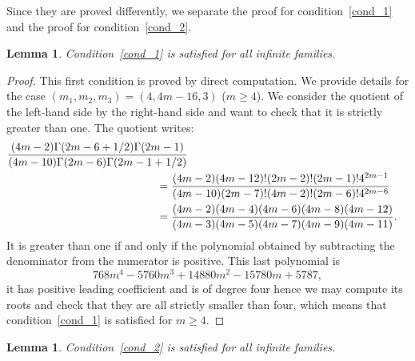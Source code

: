 \documentclass[JEP,XML,SOM,Unicode, NoEqCountersInSection, NoFloatCountersInSection]{cedram}
\theoremstyle{plain}
\newtheorem{lem}[thm]{Lemma}
\theoremstyle{definition}
\begin{document}
Since they are proved differently, we separate the proof for condition~\eqref{cond_1}
and the proof for condition~\eqref{cond_2}.

\begin{lem}
Condition~\eqref{cond_1} is satisfied for all infinite families.
\end{lem}

\begin{proof}
This first condition is proved by direct computation.
We provide details for the case $(m_1,m_2,m_3)=(4,4m-16,3)$ ($m\geq 4$).
We consider the quotient of the left-hand side by the right-hand side and want to check that it is
strictly greater than one. The quotient writes:
\begin{align*}
 \frac{(4m-2)\Gamma(2m-6+1/2)\Gamma(2m-1)}{(4m-10)\Gamma(2m-6)\Gamma(2m-1+1/2)}\\
&\hspace*{-1cm} =\frac{(4m-2)(4m-12)!(2m-2)!(2m-1)!4^{2m-1}}{(4m-10)(2m-7)!(4m-2)!(2m-6)!4^{2m-6}} \\
&\hspace*{-1cm} = \frac{(4m-2)(4m-4)(4m-6)(4m-8)(4m-12)}{(4m-3)(4m-5)(4m-7)(4m-9)(4m-11)}.
\end{align*}
It is greater than one if and only if the polynomial obtained by subtracting the
denominator from the numerator is positive. This last polynomial is
\begin{equation*}
768 m^4 - 5760 m^3 + 14880 m^2 - 15780 m + 5787,
\end{equation*}
it has positive leading coefficient and is of degree four
hence we may compute its roots and check
that they are all strictly smaller than four, which means that condition~\eqref{cond_1}
is satisfied for $m\geq 4$.
\end{proof}

\begin{lem}
Condition~\eqref{cond_2} is satisfied for all infinite families.
\end{lem}
\end{document}
